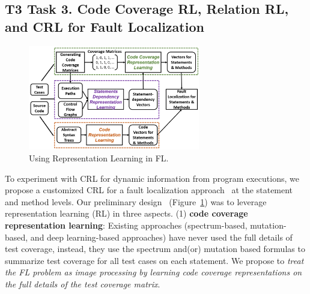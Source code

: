 \subsection{T3 Task 3. Code Coverage RL, Relation RL, and CRL for Fault Localization}

\begin{figure}
	\vspace{-12pt}
	\centering
	\includegraphics[height=1.8in]{graphs/newOverview}
	\vspace{-20pt}
	\caption{Using Representation Learning in FL.}
	\label{floverview}
	\vspace{-10pt}
\end{figure}
To experiment with CRL for dynamic information from program
executions, we propose a customized CRL for a fault localization
approach~\cite{icse_fl_21} at the statement and method levels.
%
Our preliminary design~\cite{icse_fl_21} (Figure~\ref{floverview}) was
to leverage representation learning (RL) in three aspects. (1) {\bf
  code coverage representation learning}: Existing approaches
(spectrum-based, mutation-based, and deep learning-based approaches)
have never used the full details of test coverage, instead, they use
the spectrum and(or) mutation based formulas to summarize test
coverage for all test cases on each statement. We propose to {\em
  treat the FL problem as image processing by learning code coverage
  representations on the full details of the test coverage matrix}.

